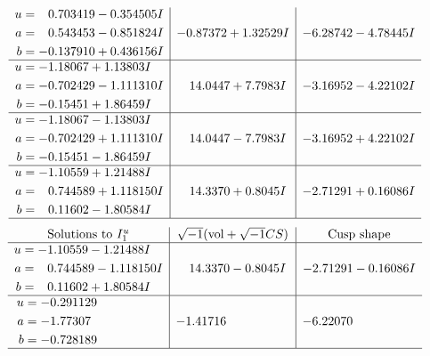 \documentclass[1p]{elsarticle_modified}
\theoremstyle{definition}
\newcommand{\I}{\sqrt{-1}}
\begin{document}
$$\begin{array}{c|c|c}
\begin{aligned}
u &= \phantom{-}0.703419 - 0.354505 I \\
a &= \phantom{-}0.543453 - 0.851824 I \\
b &= -0.137910 + 0.436156 I\end{aligned}
 & -0.87372 + 1.32529 I & -6.28742 - 4.78445 I \\ \hline\begin{aligned}
u &= -1.18067 + 1.13803 I \\
a &= -0.702429 - 1.111310 I \\
b &= -0.15451 + 1.86459 I\end{aligned}
 & \phantom{-}14.0447 + 7.7983 I & -3.16952 - 4.22102 I \\ \hline\begin{aligned}
u &= -1.18067 - 1.13803 I \\
a &= -0.702429 + 1.111310 I \\
b &= -0.15451 - 1.86459 I\end{aligned}
 & \phantom{-}14.0447 - 7.7983 I & -3.16952 + 4.22102 I \\ \hline\begin{aligned}
u &= -1.10559 + 1.21488 I \\
a &= \phantom{-}0.744589 + 1.118150 I \\
b &= \phantom{-}0.11602 - 1.80584 I\end{aligned}
 & \phantom{-}14.3370 + 0.8045 I & -2.71291 + 0.16086 I\\
 \hline 
 \end{array}$$\newpage$$\begin{array}{c|c|c}  
\text{Solutions to }I^u_{1}& \I (\text{vol} + \sqrt{-1}CS) & \text{Cusp shape}\\
 \hline 
\begin{aligned}
u &= -1.10559 - 1.21488 I \\
a &= \phantom{-}0.744589 - 1.118150 I \\
b &= \phantom{-}0.11602 + 1.80584 I\end{aligned}
 & \phantom{-}14.3370 - 0.8045 I & -2.71291 - 0.16086 I \\ \hline\begin{aligned}
u &= -0.291129\phantom{ +0.000000I} \\
a &= -1.77307\phantom{ +0.000000I} \\
b &= -0.728189\phantom{ +0.000000I}\end{aligned}
 & -1.41716\phantom{ +0.000000I} & -6.22070\phantom{ +0.000000I}\\
 \hline 
 \end{array}$$\newpage\newpage\renewcommand{\arraystretch}{1}
\end{document}
